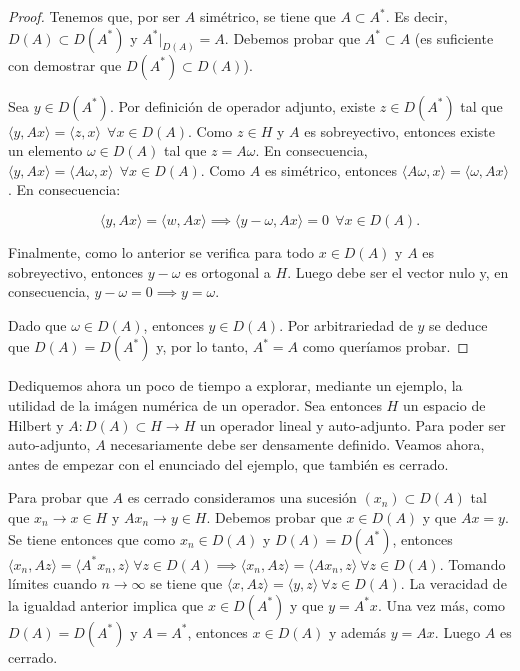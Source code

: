 \begin{proof}
    Tenemos que, por ser $A$ simétrico, se tiene que $A \subset A^*$. Es decir, $D(A) \subset D(A^*)$ y $A^*|_{D(A)} =A$. Debemos probar que $A^* \subset A$ (es suficiente con demostrar que $D(A^*) \subset D(A)$).

    Sea $y \in D(A^*)$. Por definición de operador adjunto, existe $z \in D(A^*)$ tal que $\langle y , Ax\rangle = \langle z ,x \rangle \ \ \forall x \in D(A)$. Como $z \in H$ y $A$ es sobreyectivo, entonces existe un elemento $\omega \in D(A)$ tal que $z = A\omega$. En consecuencia, $\langle y, Ax\rangle = \langle A \omega, x \rangle \ \ \forall x \in D(A)$. Como $A$ es simétrico, entonces $\langle A \omega, x \rangle = \langle \omega, Ax \rangle$. En consecuencia:

    \[\langle y ,Ax \rangle = \langle w, Ax\rangle \implies \langle y - \omega, Ax \rangle = 0 \ \ \forall x \in D(A).\]

    Finalmente, como lo anterior se verifica para todo $x \in D(A)$ y $A$ es sobreyectivo, entonces $y - \omega$ es ortogonal a $H$. Luego debe ser el vector nulo y, en consecuencia, $y - \omega = 0 \implies y = \omega$.

    Dado que $\omega \in D(A)$, entonces $y \in D(A)$. Por arbitrariedad de $y$ se deduce que $D(A) = D(A^*)$ y, por lo tanto, $A^* = A$ como queríamos probar.
\end{proof}

Dediquemos ahora un poco de tiempo a explorar, mediante un ejemplo, la utilidad de la imágen numérica de un operador. Sea entonces $H$ un espacio de Hilbert y $A : D(A) \subset H \rightarrow H$ un operador lineal y auto-adjunto. Para poder ser auto-adjunto, $A$ necesariamente debe ser densamente definido. Veamos ahora, antes de empezar con el enunciado del ejemplo, que también es cerrado.

Para probar que $A$ es cerrado consideramos una sucesión $(x_n) \subset D(A)$ tal que $x_n \rightarrow x \in H$ y $Ax_n \rightarrow y \in H$. Debemos probar que $x \in D(A)$ y que $Ax = y$. Se tiene entonces que como $x_n \in D(A)$ y $D(A) = D(A^*)$, entonces $\langle x_n, Az \rangle = \langle A^* x_n, z \rangle \ \forall z \in D(A) \implies \langle x_n, Az \rangle = \langle Ax_n, z \rangle \ \forall z \in D(A)$. Tomando límites cuando $n \rightarrow \infty$ se tiene que $\langle x, Az \rangle = \langle y, z\rangle \ \forall z \in D(A)$. La veracidad de la igualdad anterior implica que $x \in D(A^*)$ y que $y = A^*x$. Una vez más, como $D(A) = D(A^*)$ y $A = A^*$, entonces $x \in D(A)$ y además $y = Ax$. Luego $A$ es cerrado.

